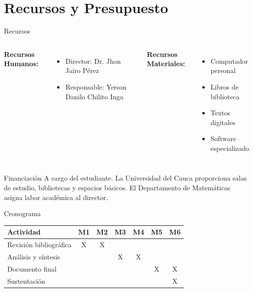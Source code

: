 \documentclass[aspectratio=169]{beamer}
\theoremstyle{definition}
\begin{document}
	\section{Recursos y Presupuesto}
	
	\begin{frame}{Recursos}
		\begin{columns}
			\textbf{Recursos Humanos:}
			\begin{itemize}
				\item Director: Dr. Jhon Jairo Pérez
				\item Responsable: Yerson Danilo Chilito Inga
			\end{itemize}
			
			\textbf{Recursos Materiales:}
			\begin{itemize}
				\item Computador personal
				\item Libros de biblioteca
				\item Textos digitales
				\item Software especializado
			\end{itemize}
		\end{columns}
		
		\vspace{0.8cm}
		
		\begin{block}{Financiación}
			A cargo del estudiante. La Universidad del Cauca proporciona salas de estudio, bibliotecas y espacios básicos. El Departamento de Matemáticas asigna labor académica al director.
		\end{block}
	\end{frame}
	
	\begin{frame}{Cronograma}
		\begin{table}
			\centering
			\small
			\begin{tabular}{|l|c|c|c|c|c|c|}
				\hline
				\textbf{Actividad} & \textbf{M1} & \textbf{M2} & \textbf{M3} & \textbf{M4} & \textbf{M5} & \textbf{M6} \\ \hline
				Revisión bibliográfica & X & X & & & & \\ \hline
				Análisis y síntesis & & & X & X & & \\ \hline
				Documento final & & & & & X & X \\ \hline
				Sustentación & & & & & & X \\ \hline
			\end{tabular}
		\end{table}
	\end{frame}
	
\end{document}
